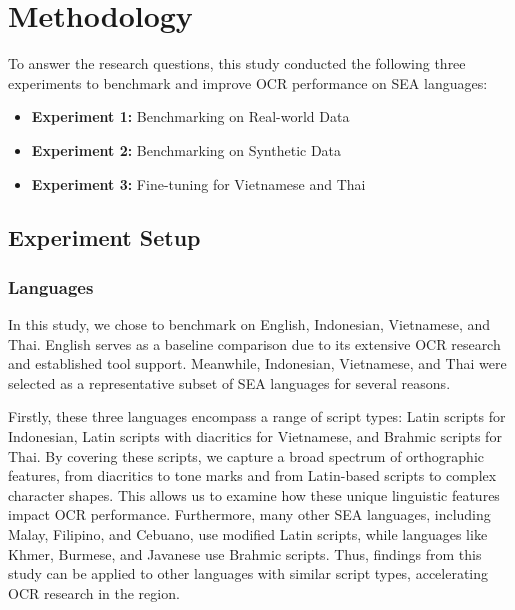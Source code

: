 \documentclass[12pt,oneside]{memoir}
\begin{document}
\chapter{Methodology}

To answer the research questions, this study conducted the following three experiments to benchmark and improve OCR performance on SEA languages:

\begin{itemize}
    \item \textbf{Experiment 1:} Benchmarking on Real-world Data
    \item \textbf{Experiment 2:} Benchmarking on Synthetic Data
    \item \textbf{Experiment 3:} Fine-tuning for Vietnamese and Thai
\end{itemize}

\section{Experiment Setup}

\subsection{Languages}

In this study, we chose to benchmark on English, Indonesian, Vietnamese, and Thai. English serves as a baseline comparison due to its extensive OCR research and established tool support. Meanwhile, Indonesian, Vietnamese, and Thai were selected as a representative subset of SEA languages for several reasons.

Firstly, these three languages encompass a range of script types: Latin scripts for Indonesian, Latin scripts with diacritics for Vietnamese, and Brahmic scripts for Thai. 
By covering these scripts, we capture a broad spectrum of orthographic features, from diacritics to tone marks and from Latin-based scripts to complex character shapes. This allows us to examine how these unique linguistic features impact OCR performance. 
Furthermore, many other SEA languages, including Malay, Filipino, and Cebuano, use modified Latin scripts, while languages like Khmer, Burmese, and Javanese use Brahmic scripts. Thus, findings from this study can be applied to other languages with similar script types, accelerating OCR research in the region.
\end{document}

